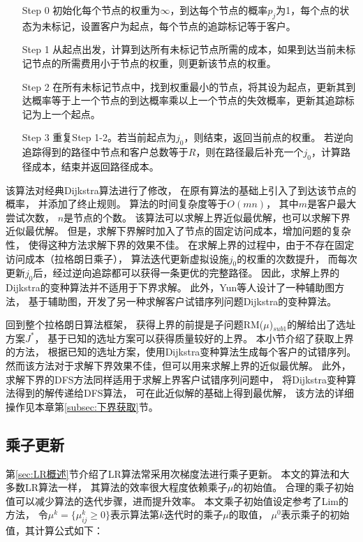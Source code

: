 \begin{enumerate}[leftmargin=0pt,itemindent=3.5\ccwd,nosep]
  \item[Step 0] 初始化每个节点的权重为$\infty$，到达每个节点的概率$p_j$为1，每个点的状态为未标记，设置客户为起点，每个节点的追踪标记等于客户。
  \item[Step 1] 从起点出发，计算到达所有未标记节点所需的成本，如果到达当前未标记节点的所需费用小于节点的权重，则更新该节点的权重。
  \item[Step 2] 在所有未标记节点中，找到权重最小的节点，将其设为起点，更新其到达概率等于上一个节点的到达概率乘以上一个节点的失效概率，更新其追踪标记为上一个起点。
  \item[Step 3] 重复Step 1-2。若当前起点为$j_0$，则结束，返回当前点的权重。
  若逆向追踪得到的路径中节点和客户总数等于$R$，则在路径最后补充一个$j_0$，计算路径成本，结束并返回路径成本。
\end{enumerate}

该算法对经典Dijkstra算法进行了修改，
在原有算法的基础上引入了到达该节点的概率，
并添加了终止规则。
算法的时间复杂度等于$O(mn)$，
其中$m$是客户最大尝试次数，
$n$是节点的个数。
该算法可以求解上界近似最优解，也可以求解下界近似最优解。
但是，求解下界解时加入了节点的固定访问成本，增加问题的复杂性，
使得这种方法求解下界的效果不佳。
在求解上界的过程中，由于不存在固定访问成本（拉格朗日乘子），
算法迭代更新虚拟设施$j_0$的权重的次数提升，
而每次更新$j_0$后，经过逆向追踪都可以获得一条更优的完整路径。
因此，求解上界的Dijkstra的变种算法并不适用于下界求解。
此外，Yun\cite{YUN2020}等人设计了一种辅助图方法，
基于辅助图，开发了另一种求解客户试错序列问题Dijkstra的变种算法。

回到整个拉格朗日算法框架，
获得上界的前提是子问题RM($\mu$)$_{sub1}$的解给出了选址方案$J^*$，
基于已知的选址方案可以获得质量较好的上界\cite{Daskin书,yun2015}。
本小节介绍了获取上界的方法，
根据已知的选址方案，使用Dijkstra变种算法生成每个客户的试错序列。
然而该方法对于求解下界效果不佳，但可以用来求解上界的近似最优解。
此外，求解下界的DFS方法同样适用于求解上界客户试错序列问题中，
将Dijkstra变种算法得到的解传递给DFS算法，
可在此近似解的基础上得到最优解，
该方法的详细操作见本章第\ref{subsec:下界获取}节。

\subsection{乘子更新}
\label{subsec:乘子更新}
第\ref{sec:LR概述}节介绍了LR算法常采用次梯度法进行乘子更新。
本文的算法和大多数LR算法一样\cite{Daskin书,yun2015,Snyder2005}，
其算法的效率很大程度依赖乘子$\mu$的初始值。
合理的乘子初始值可以减少算法的迭代步骤，进而提升效率。
本文乘子初始值设定参考了Lim\cite{lim}的方法，
令$\mu^k=\{\mu_{ij}^k \ge 0\}$表示算法第$k$迭代时的乘子$\mu$的取值，
$\mu^0$表示乘子的初始值，其计算公式如下：

